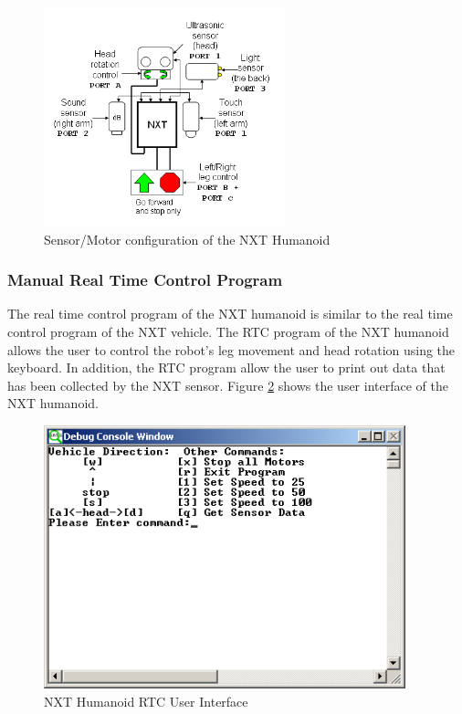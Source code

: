 \documentclass[11pt]{article}
\begin{document}
\begin{figure}[ht]
  \begin{center}
    \includegraphics[height=2.5in]{figure/mindstorm/NXT_human_port.png}
    \caption{Sensor/Motor configuration of the NXT Humanoid\label{fig_NXT_human_port}}
  \end{center}
\end{figure}

\newpage
\subsubsection{Manual Real Time Control Program}
The real time control program of the NXT humanoid is similar to the real time control program of the NXT vehicle.
The RTC program of the NXT humanoid allows the user to control the robot's leg movement and head rotation using the
keyboard. In addition, the RTC program allow the user to print out data that has been collected by the NXT sensor.
Figure \ref{fig_human_UI} shows the user interface of the NXT humanoid.

\begin{figure}[ht]
  \begin{center}
    \includegraphics[height=3in]{figure/mindstorm/human_UI.png}
    \caption{NXT Humanoid RTC User Interface \label{fig_human_UI}}
  \end{center}
\end{figure}
\end{document}
